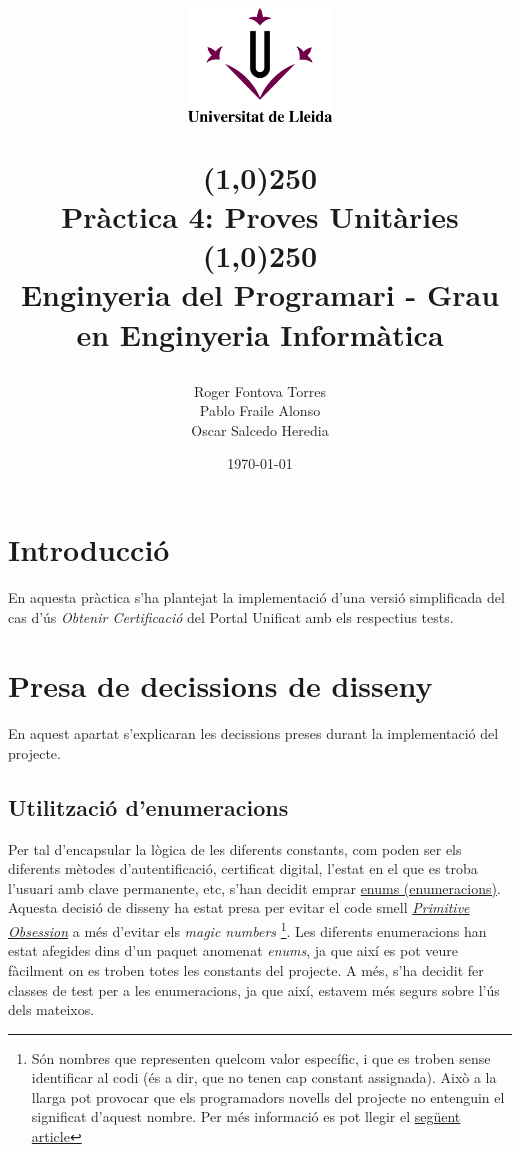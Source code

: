 \documentclass[12pt, letterpaper]{article}
\title{%
    \begin{center}
	\includegraphics[width=4cm,height=3cm]{udl.png}
    \end{center}
    \line(1,0){250}\\[0.3cm]
    \textbf{Pràctica 4: Proves Unitàries}
    \line(1,0){250}
    \\[0.5cm]
	\large Enginyeria del Programari - Grau en Enginyeria Informàtica
}
\author{Roger Fontova Torres \\ Pablo Fraile Alonso \\ Oscar Salcedo Heredia}
\date{\today}
\begin{document}
    
\maketitle
\thispagestyle{empty}
\newpage
\tableofcontents
\newpage


\section{Introducció}
\label{introduction}
En aquesta pràctica s'ha plantejat la implementació d'una versió simplificada del cas d'ús  \textit{Obtenir Certificació} del Portal Unificat amb els respectius tests. \\

\section{Presa de decissions de disseny}
\label{decissisions}
En aquest apartat s'explicaran les decissions preses durant la implementació del projecte.

\subsection{Utilització d'enumeracions}
\label{enumeracions}
Per tal d'encapsular la lògica de les diferents constants, com poden ser els diferents mètodes d'autentificació, certificat digital, l'estat en el que es troba l'usuari amb clave permanente, etc, s'han decidit emprar \href{https://docs.oracle.com/javase/tutorial/java/javaOO/enum.html}{enums (enumeracions)}.\\

Aquesta decisió de disseny ha estat presa per evitar el code smell \href{https://refactoring.guru/smells/primitive-obsession}{\textit{Primitive Obsession}} a més d'evitar els \textit{magic numbers} \footnote{Són nombres que representen quelcom valor específic, i que es troben sense identificar al codi (és a dir, que no tenen cap constant assignada). Això a la llarga pot provocar que els programadors novells del projecte no entenguin el significat d'aquest nombre. Per més informació es pot llegir el \href{https://en.wikipedia.org/wiki/Magic_number_(programming)}{següent article}}. Les diferents enumeracions han estat afegides dins d'un paquet anomenat \textit{enums}, ja que així es pot veure fàcilment on es troben totes les constants del projecte. A més, s'ha decidit fer classes de test per a les enumeracions, ja que així, estavem més segurs sobre l'ús dels mateixos.
\end{document}
